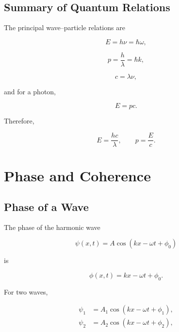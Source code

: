 \documentclass[12pt]{article}
\begin{document}
\subsection{Summary of Quantum Relations}

The principal wave--particle relations are

\begin{equation}
\boxed{E=h\nu=\hbar\omega},
\end{equation}

\begin{equation}
\boxed{p=\frac{h}{\lambda}=\hbar k},
\end{equation}

\begin{equation}
\boxed{c=\lambda\nu},
\end{equation}

and for a photon,

\begin{equation}
\boxed{E=pc}.
\end{equation}

Therefore,

\begin{equation}
E=\frac{hc}{\lambda},
\qquad
p=\frac{E}{c}.
\end{equation}

\section{Phase and Coherence}

\subsection{Phase of a Wave}

The phase of the harmonic wave

\begin{equation}
\psi(x,t)=A\cos(kx-\omega t+\phi_0)
\end{equation}

is

\begin{equation}
\boxed{\phi(x,t)=kx-\omega t+\phi_0}.
\end{equation}

For two waves,

\begin{align}
\psi_1 &= A_1\cos(kx-\omega t+\phi_1),\\
\psi_2 &= A_2\cos(kx-\omega t+\phi_2),
\end{align}
\end{document}
